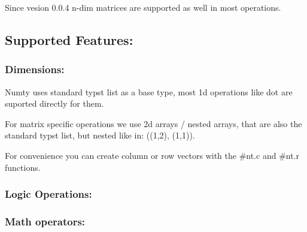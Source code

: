 Since vesion 0.0.4 n-dim matrices are supported as well in most
operations.

\subsection{Supported Features:}\label{supported-features}

\subsubsection{Dimensions:}\label{dimensions}

Numty uses standard typst list as a base type, most 1d operations like
dot are suported directly for them.

For matrix specific operations we use 2d arrays / nested arrays, that
are also the standard typst list, but nested like in: ((1,2), (1,1)).

For convenience you can create column or row vectors with the \#nt.c and
\#nt.r functions.

\begin{Shaded}
\begin{Highlighting}[]

\end{Highlighting}
\end{Shaded}

\subsubsection{Logic Operations:}\label{logic-operations}

\begin{Shaded}
\begin{Highlighting}[]

\end{Highlighting}
\end{Shaded}

\subsubsection{Math operators:}\label{math-operators}

